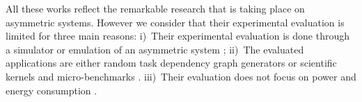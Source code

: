 

All these works reflect the remarkable research that is taking place on asymmetric systems. 
However we consider that their experimental evaluation is limited for three main reasons:
i)~Their experimental evaluation is done through a simulator or emulation of an asymmetric 
system \cite{Kumar_micro_2003, Kumar:ISCA2004, Morad_area_based, Balakrishnan:ISCA2005, 
Koufaty_bias, VanCraeynest_fairness, VanCraeynest_PIE, Rodrigues_thread_scheduling, Hetero93, 
Hetero95, Dup09, Suleman:APLOS2009, Joao:ASPLOS2012,Joao:ISCA2013};
ii)~The evaluated applications are either random task dependency graph generators or scientific 
kernels and micro-benchmarks \cite{Hetero93, Chronaki:ICS2015, HEFT, LDCP}.
iii)~Their evaluation does not focus on power and energy consumption \cite{Kumar:ISCA2004, 
VanCraeynest_fairness, VanCraeynest_PIE, Hetero93, Hetero95, Chronaki:ICS2015}.

